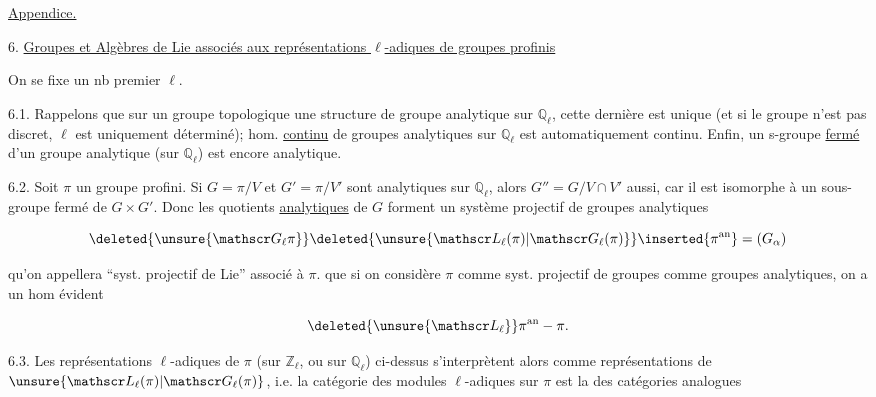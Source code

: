 \uline{Appendice.}

6. \uline{Groupes et Algèbres de Lie  associés aux représentations $\ell$-adiques de groupes profinis}

On se fixe un nb premier $\ell$.

6.1. Rappelons que sur un groupe topologique  une structure de groupe analytique sur $\mathbb Q_\ell$, cette dernière est unique (et si le groupe n'est pas discret, $\ell$ est uniquement déterminé);    hom. \uline{continu} de groupes analytiques sur $\mathbb Q_\ell$ est automatiquement continu. Enfin, un s-groupe \uline{fermé} d'un groupe analytique (sur $\mathbb Q_\ell$) est encore analytique.

6.2. Soit  $\pi$ un groupe profini. Si $G=\pi/V$ et $G'=\pi/V'$ sont analytiques sur $\mathbb Q_\ell$, alors $G''=G/V\cap V'$ aussi, car il  est isomorphe à un sous-groupe fermé de $G\times G'$. Donc les  quotients \uline{analytiques} de $G$ forment un système projectif de groupes analytiques

\[
\deleted{\unsure{\mathscr G_\ell\pi}}\deleted{\unsure{\mathscr L_\ell(\pi)|\mathscr G_\ell(\pi)}}\inserted{\pi^{\mathrm{an}}}=(G_\alpha)
\]

qu'on appellera ``syst. projectif de Lie'' associé à $\pi$.  que si on considère $\pi$ comme   syst. projectif de groupes  comme groupes analytiques, on a un hom évident

\[
\deleted{\unsure{\mathscr L_\ell}}\pi^{\mathrm{an}}\mathbin{-}\pi.
\]

6.3. Les représentations $\ell$-adiques de $\pi$ (sur $\mathbb Z_\ell$, ou sur $\mathbb Q_\ell$) ci-dessus s'interprètent alors comme représentations  de $\unsure{\mathscr L_\ell(\pi)|\mathscr G_\ell(\pi)}$, i.e. la catégorie des modules $\ell$-adiques sur $\pi$ est la  des catégories analogues
